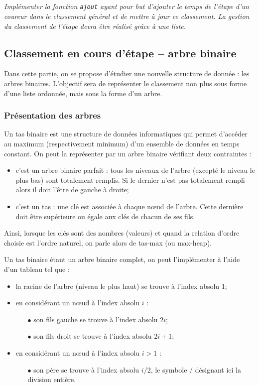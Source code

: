 \documentclass[10pt,fleqn]{article} %
\begin{document}
\begin{multicols}{2}
\subparagraph{}
\textit{Implémenter la fonction \texttt{ajout} ayant pour but d'ajouter le temps de l'étape d'un coureur dans le classement général et de mettre à jour ce classement. La gestion du classement de l'étape devra être réalisé grâce à une liste.}

\newpage

\subsection*{Classement en cours d'étape -- arbre binaire}
Dans cette partie, on se propose d'étudier une nouvelle structure de donnée : les arbres binaires. L'objectif sera de représenter le classement non plus sous forme d'une liste ordonnée, mais sous la forme d'un arbre. 

\subsubsection*{Présentation des arbres}
Un tas binaire est une structure de données informatiques qui permet d'accéder
au maximum (respectivement minimum) d'un ensemble de données en temps
constant. On peut la représenter par un arbre binaire vérifiant
deux contraintes :
\begin{itemize}
\item c'est un arbre binaire parfait : tous les niveaux de l'arbre
(excepté le niveau le plus bas) sont totalement remplis. Si le dernier n'est pas totalement rempli alors il doit l'être de gauche à droite;
\item c'est un tas : une clé est associée à chaque nœud de l'arbre. Cette dernière doit être supérieure ou égale aux clés de chacun de ses fils.
\end{itemize}

Ainsi, lorsque les clés sont des nombres (valeurs) et quand la relation d'ordre choisie est l'ordre naturel, on parle alors de tas-max (ou max-heap). 

Un tas binaire étant un arbre binaire complet, on peut l'implémenter à l'aide d'un tableau tel que :
\begin{itemize}
\item la racine de l'arbre (niveau le plus haut) se trouve à l'index absolu 1;
\item en considérant un nœud à l'index absolu $i$ :
\begin{itemize}
\item[$\bullet$] son fils gauche se trouve à l'index absolu $2i$;
\item[$\bullet$] son fils droit se trouve à l'index absolu $2i + 1$;
\end{itemize}
\item en considérant un nœud à l'index absolu $i > 1$ :
\begin{itemize}
\item [$\bullet$]son père se trouve à l'index absolu $i/2$, le symbole / désignant ici la division entière.
\end{itemize}
\end{itemize}


\end{multicols}
\end{document}
